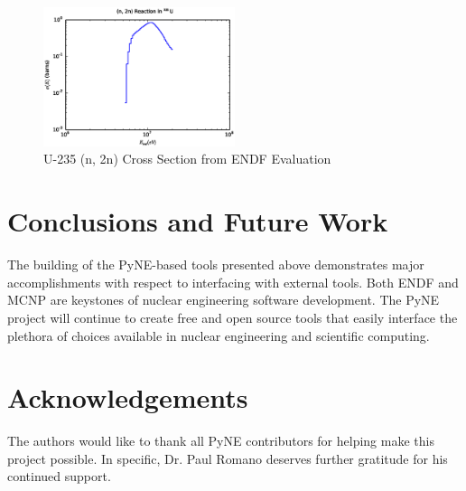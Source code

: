 \documentclass{anstrans}
\begin{document}
\begin{figure}[htbp]
  \centering
  \includegraphics[width=0.5\textwidth]{u235_2n.eps}
  \caption{U-235 (n, 2n) Cross Section from ENDF Evaluation}
  \label{u235}
\end{figure}


\section{Conclusions and Future Work}
\label{sec:conc}

The building of the PyNE-based tools presented above demonstrates major 
accomplishments with respect
to interfacing with external tools.  Both ENDF and MCNP are keystones of 
nuclear engineering software development.  The PyNE project will continue to create 
free and open source tools that easily interface the plethora of choices available 
in nuclear engineering and scientific computing. 

\section{Acknowledgements}
\label{sec:ack}

The authors would like to thank all PyNE contributors for helping make this project 
possible.  In specific, Dr. Paul Romano deserves further gratitude for his 
continued support.



\end{document}

